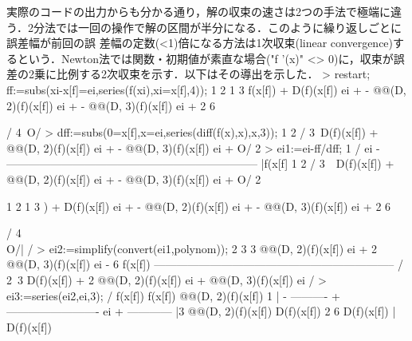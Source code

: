 実際のコードの出力からも分かる通り，解の収束の速さは2つの手法で極端に違う．2分法では一回の操作で解の区間が半分になる．このように繰り返しごとに誤差幅が前回の誤
差幅の定数(<1)倍になる方法は1次収束(linear convergence)するという．Newton法では関数・初期値が素直な場合("f '(x)" <>
0)に，収束が誤差の2乗に比例する2次収束を示す．以下はその導出を示した．
> restart; ff:=subs(xi-x[f]=ei,series(f(xi),xi=x[f],4));
                          1                     2   1                     3   
f(x[f]) + D(f)(x[f]) ei + - @@(D, 2)(f)(x[f]) ei  + - @@(D, 3)(f)(x[f]) ei  + 
                          2                         6                         

   /  4\
  O\ei /
> dff:=subs({0=x[f],x=ei},series(diff(f(x),x),x,3));
                                         1                     2    /  3\
     D(f)(x[f]) + @@(D, 2)(f)(x[f]) ei + - @@(D, 3)(f)(x[f]) ei  + O\ei /
                                         2                               
> ei1:=ei-ff/dff;
                                      1                                   /      
ei - -------------------------------------------------------------------- |f(x[f]
                                         1                     2    /  3\ \      
     D(f)(x[f]) + @@(D, 2)(f)(x[f]) ei + - @@(D, 3)(f)(x[f]) ei  + O\ei /        
                                         2                                       

                      1                     2   1                     3   
  ) + D(f)(x[f]) ei + - @@(D, 2)(f)(x[f]) ei  + - @@(D, 3)(f)(x[f]) ei  + 
                      2                         6                         

   /  4\\
  O\ei /|
        /
> ei2:=simplify(convert(ei1,polynom));
                              2                         3              
        3 @@(D, 2)(f)(x[f]) ei  + 2 @@(D, 3)(f)(x[f]) ei  - 6 f(x[f])  
      -----------------------------------------------------------------
        /                                                            2\
      3 \2 D(f)(x[f]) + 2 @@(D, 2)(f)(x[f]) ei + @@(D, 3)(f)(x[f]) ei /
> ei3:=series(ei2,ei,3);
                                                           /                   
   f(x[f])     f(x[f]) @@(D, 2)(f)(x[f])           1       |                   
- ---------- + ------------------------- ei + ------------ |3 @@(D, 2)(f)(x[f])
  D(f)(x[f])                    2             6 D(f)(x[f]) |                   
                      D(f)(x[f])                           \                   

